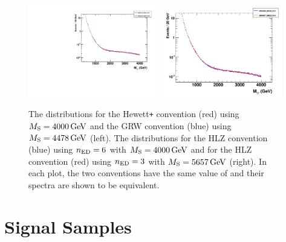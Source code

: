 \begin{figure}[!htbp]
  \centering
  \includegraphics[width=0.51\textwidth]{figures/diphoton_mgg_acc_MS4478_NED4_KK1_MS4000_NED2_KK3.pdf}
  \includegraphics[width=0.4650\textwidth]{figures/HLZ_etaG_scaling.png}
  \caption{The \mgg distributions for the Hewett\texttt{+} convention (red) using $M_{\rm S} = 4000\,\text{Ge\hspace{-.08em}V}$ and the GRW convention (blue) using $M_{\rm S} = 4478\,\text{Ge\hspace{-.08em}V}$ (left). The \mgg distributions for the HLZ convention (blue) using $n_{\rm ED} = 6$ with $M_{\rm S} = 4000\,\text{Ge\hspace{-.08em}V}$ and for the HLZ convention (red) using $n_{\rm ED}=3$ with $M_{\rm S} = 5657\,\text{Ge\hspace{-.08em}V}$ (right). In each plot, the two conventions have the same value of \etaG and their spectra are shown to be equivalent.}
  \label{fig:ADD_diff_convention_equiv}
\end{figure}


\section{Signal Samples}

